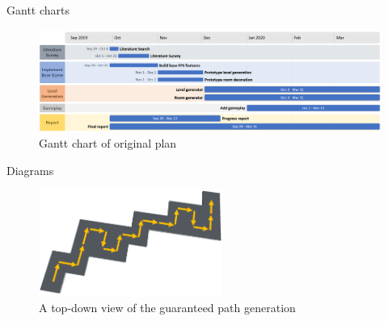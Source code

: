 \documentclass[progress]{cmpreport}
\begin{document}


\newpage

\appendix

\begin{section}{Gantt charts}

\begin{figure}
    \includegraphics[width=\textwidth,height=0.9\textheight,keepaspectratio]{img/gantt-original.png}
    \caption{Gantt chart of original plan}
    \label{fig:gantt1}
\end{figure}

\end{section}

\begin{section}{Diagrams}

\begin{figure}
    \includegraphics[width=6cm]{img/1-maze.png}
    \caption{A top-down view of the guaranteed path generation}
    \label{fig:pathgen}
\end{figure}

\end{section}
\end{document}
